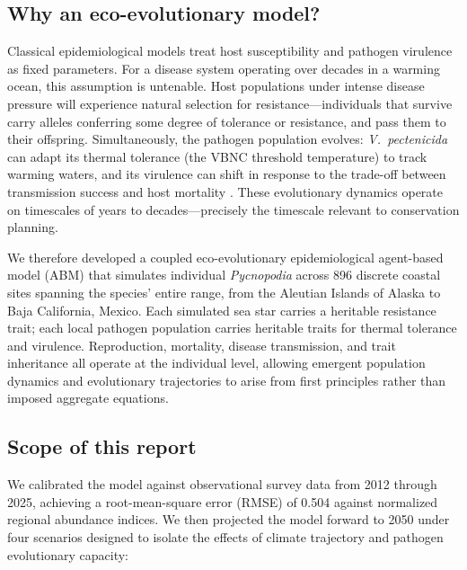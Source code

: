 \subsection{Why an eco-evolutionary model?}

Classical epidemiological models treat host susceptibility and pathogen virulence as
fixed parameters. For a disease system operating over decades in a warming ocean,
this assumption is untenable. Host populations under intense disease pressure will
experience natural selection for resistance---individuals that survive carry alleles
conferring some degree of tolerance or resistance, and pass them to their offspring.
Simultaneously, the pathogen population evolves: \textit{V.\ pectenicida} can adapt
its thermal tolerance (the VBNC threshold temperature) to track warming waters, and
its virulence can shift in response to the trade-off between transmission success
and host mortality \citep{anderson1982}. These evolutionary dynamics operate on
timescales of years to decades---precisely the timescale relevant to conservation
planning.

We therefore developed a coupled eco-evolutionary epidemiological agent-based model
(ABM) that simulates individual \textit{Pycnopodia} across 896 discrete coastal sites
spanning the species' entire range, from the Aleutian Islands of Alaska to Baja
California, Mexico. Each simulated sea star carries a heritable resistance trait;
each local pathogen population carries heritable traits for thermal tolerance and
virulence. Reproduction, mortality, disease transmission, and trait inheritance all
operate at the individual level, allowing emergent population dynamics and
evolutionary trajectories to arise from first principles rather than imposed
aggregate equations.

\subsection{Scope of this report}

We calibrated the model against observational survey data from 2012 through 2025,
achieving a root-mean-square error (RMSE) of 0.504 against normalized regional
abundance indices. We then projected the model forward to 2050 under four scenarios
designed to isolate the effects of climate trajectory and pathogen evolutionary
capacity:

